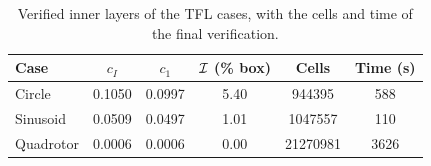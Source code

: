 \begin{table}[ht]
\centering\small
\caption{Verified inner layers of the TFL cases, with the cells and time of the final verification.}
\label{tab:inner}
\begin{tabular}{lccccc}
\toprule
Case & $c_I$ & $c_1$ & $\mathcal I$ (\% box) & Cells & Time (s)\\
\midrule
Circle & 0.1050 & 0.0997 & 5.40 & 944395 & 588\\
Sinusoid & 0.0509 & 0.0497 & 1.01 & 1047557 & 110\\
Quadrotor & 0.0006 & 0.0006 & 0.00 & 21270981 & 3626\\
\bottomrule
\end{tabular}
\end{table}
